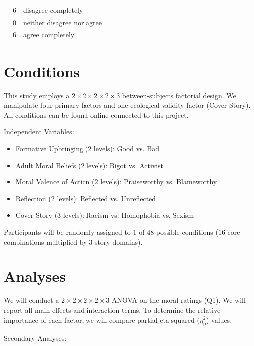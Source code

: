 \documentclass[scrarticle]{scrartcl}
\begin{document}
\vspace{0.75em}
\begin{tabular}{r @{ = } l}
   $-6$   & disagree completely          \\
    $0$   & neither disagree nor agree   \\
    $6$   & agree completely             \\
\end{tabular}


\section{Conditions}
This study employs a $2 \times 2 \times 2 \times 2 \times 3$ between-subjects factorial design.
We manipulate four primary factors and one ecological validity factor (Cover Story).
All conditions can be found online connected to this project.

\vspace{0.75em}
\noindent Independent Variables:

\begin{itemize}[noitemsep]
   \item[(1)] Formative Upbringing ($2$ levels): Good vs. Bad
   \item[(2)] Adult Moral Beliefs ($2$ levels): Bigot vs. Activist
   \item[(3)] Moral Valence of Action ($2$ levels): Praiseworthy vs. Blameworthy
   \item[(4)] Reflection ($2$ levels): Reflected vs. Unreflected
   \item[(5)] Cover Story ($3$ levels): Racism vs. Homophobia vs. Sexism
\end{itemize}

\noindent Participants will be randomly assigned to $1$ of $48$ possible conditions ($16$ core combinations multiplied by $3$ story domains).


\section{Analyses}
We will conduct a $2 \times 2 \times 2 \times 2 \times 3$ ANOVA on the moral ratings (Q1).
We will report all main effects and interaction terms.
To determine the relative importance of each factor, we will compare partial eta-squared ($\eta_{\text{p}}^{2}$) values.

\vspace{0.75em}
\noindent Secondary Analyses:
\end{document}
